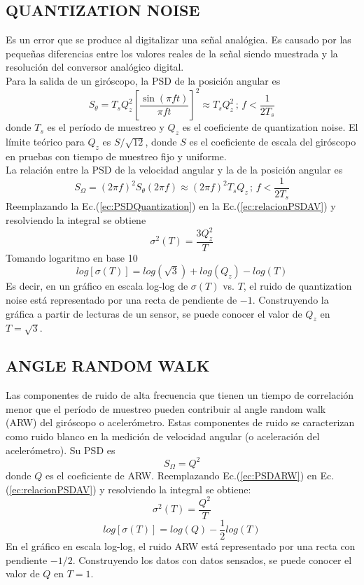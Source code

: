 \documentclass[a4paper,11pt,twoside]{IT-CNEA}
\begin{document}
\subsection{QUANTIZATION NOISE}
Es un error que se produce al digitalizar una señal analógica. Es causado por las pequeñas diferencias entre los valores reales de la señal siendo muestrada y la resolución del conversor analógico digital.
\\ Para la salida de un giróscopo, la PSD de la posición angular es
\begin{equation}
S_{\theta}=T_sQ_z^2\left[ \frac{\sin\left( \pi ft\right)}{\pi ft}\right]^2\approx T_sQ_z^2\,;\,f<\frac{1}{2T_s}
\end{equation}
donde $T_s$ es el período de muestreo y $Q_z$ es el coeficiente de quantization noise. El límite teórico para $Q_z$ es $S/\sqrt{12}$, donde $S$ es el coeficiente de escala del giróscopo en pruebas con tiempo de muestreo fijo y uniforme.
\\ La relación entre la PSD de la velocidad angular y la de la posición angular es 
\begin{equation}
S_{\Omega}=\left( 2\pi f\right)^2S_{\theta}\left( 2\pi f\right)\approx 	\left( 2\pi f\right)^2T_sQ_z\,;\,f<\frac{1}{2T_s}
\label{ec:PSDQuantization}
\end{equation}
Reemplazando la Ec.(\ref{ec:PSDQuantization}) en la Ec.(\ref{ec:relacionPSDAV}) y resolviendo la integral se obtiene
\begin{equation}
\sigma^2(T)=\frac{3Q_z^2}{T}
\end{equation}
Tomando logaritmo en base 10
\begin{equation}
log\left[ \sigma(T)\right]=log\left( \sqrt{3}\right)+log\left( Q_z\right)-log(T)
\end{equation}
Es decir, en un gráfico en escala log-log de $\sigma(T)$ vs. $T$, el ruido de quantization noise está representado por una recta de pendiente de $-1$. Construyendo la gráfica a partir de lecturas de un sensor, se puede conocer el valor de $Q_z$ en $T=\sqrt{3}$.	
\subsection{ANGLE RANDOM WALK}
Las componentes de ruido de alta frecuencia que tienen un tiempo de correlación menor que el
período de muestreo pueden contribuir al angle random walk (ARW) del giróscopo o acelerómetro. Estas componentes de ruido se caracterizan como ruido blanco en la medición de velocidad angular (o aceleración
del acelerómetro). Su PSD es
\begin{equation}
S_{\Omega}=Q^2
\label{ec:PSDARW}
\end{equation}
donde $Q$ es el coeficiente de ARW. Reemplazando Ec.(\ref{ec:PSDARW}) en Ec.(\ref{ec:relacionPSDAV}) y resolviendo la integral se obtiene:
\begin{equation}
\sigma^2(T)=\frac{Q^2}{T} 
\end{equation}
\begin{equation}
log\left[ \sigma(T)\right]=log(Q)-\frac{1}{2}log(T)
\end{equation}
En el gráfico en escala log-log, el ruido ARW está representado por una recta con pendiente $-1/2$. Construyendo los datos con datos sensados, se puede conocer el valor de $Q$ en $T=1$.
\end{document}
